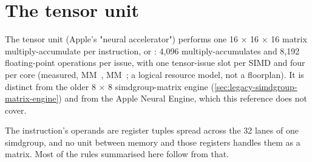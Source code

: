 \chapter{The tensor unit}\label{ch:tensor-unit}

The tensor unit (Apple's "neural accelerator") performs one 16 × 16 × 16 matrix multiply-accumulate
per instruction,  or : 4,096 multiply-accumulates and 8,192 floating-point operations per issue,
with one tensor-issue slot per SIMD and four per core (measured, MM~, MM~; a logical resource model, not a
floorplan). It is distinct from the older 8 × 8 simdgroup-matrix engine (\cref{sec:legacy-simdgroup-matrix-engine}) and from the Apple Neural
Engine, which this reference does not cover.

The instruction's operands are register tuples spread across the 32 lanes of one simdgroup, and no unit between
memory and those registers handles them as a matrix. Most of the rules summarised here follow from that.

